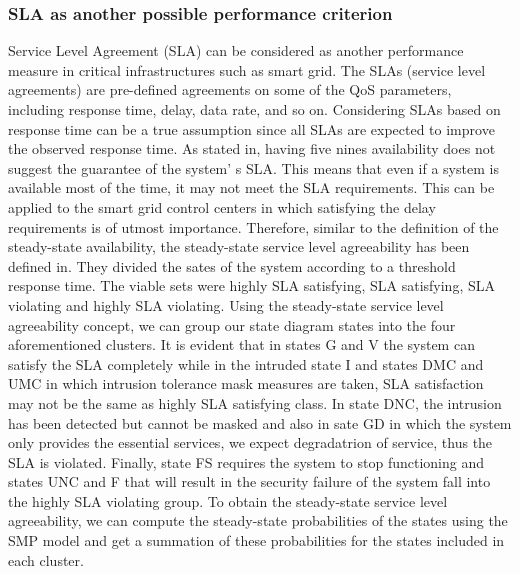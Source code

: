 \documentclass[preprint,number,12pt]{elsarticle}
\begin{document}
\subsubsection{SLA as another possible performance criterion}
Service Level Agreement (SLA) can be considered as another performance measure in critical infrastructures such as smart grid. The SLAs (service level agreements) are pre-defined agreements on some of the QoS parameters, including response time, delay, data rate, and so on. Considering SLAs based on response time can be a true assumption since all SLAs are expected to improve the observed response time. As stated in\citep{VasireddyR.andTrivedi2006}, having five nines availability does not suggest the guarantee of the system' s SLA. This means that even if a system is available most of the time, it may not meet the SLA requirements. This can be applied to the smart grid control centers in which satisfying the delay requirements is of utmost importance. Therefore, similar to the definition of the steady-state availability, the steady-state service level agreeability has been defined in\citep{VasireddyR.andTrivedi2006}. They divided the sates of the system according to a threshold response time. The viable sets were highly SLA satisfying, SLA satisfying, SLA violating and highly SLA violating. Using the steady-state service level agreeability concept, we can group our state diagram states into the four aforementioned clusters. It is evident that in states G and V the system can satisfy the SLA completely while in the intruded state I and states DMC and UMC in which intrusion tolerance mask measures are taken, SLA satisfaction may not be the same as highly SLA satisfying class. In state DNC, the intrusion has been detected but cannot be masked and also in sate GD in which the system only provides the essential services, we expect degradatrion of service, thus the SLA is violated. Finally, state FS requires the system to stop functioning and states UNC and F that will result in the security failure of the system fall into the highly SLA violating group. To obtain the steady-state service level agreeability, we can compute the steady-state probabilities of the states using the SMP model and get a summation of these probabilities for the states included in each cluster.
\end{document}
